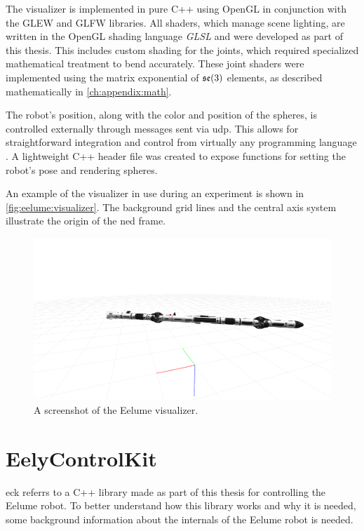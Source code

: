 The visualizer is implemented in pure C++ using OpenGL in conjunction with the 
GLEW and GLFW libraries. All shaders, which manage scene lighting, are written 
in the OpenGL shading language \textit{GLSL} and were developed as part of 
this thesis. This includes custom shading for the joints, which required 
specialized mathematical treatment to bend accurately. These joint shaders 
were implemented using the matrix exponential of \(\mathfrak{se}(3)\) elements, as 
described mathematically in \autoref{ch:appendix:math}.

The robot's position, along with the color and position of the spheres, is 
controlled externally through messages sent via \gls{udp}. This allows for 
straightforward integration and control from virtually any programming language
. A lightweight C++ header file was created to expose functions for setting 
the robot's pose and rendering spheres.

An example of the visualizer in use during an experiment is shown in
\autoref{fig:eelume:visualizer}. The background grid lines and the central
axis system illustrate the origin of the \gls{ned} frame.
\begin{figure}[h!]
    \centering
    \includegraphics[width=\textwidth]{assets/eely-visualizer.png}
    \caption{A screenshot of the Eelume visualizer.}
    \label{fig:eelume:visualizer}
\end{figure}

\FloatBarrier

\section{EelyControlKit}

\iffalse
\gls{eck} referrs to a C++ library made as part of this thesis for controlling the Eelume robot.
To better
understand how this library works and why it is needed, some background information
about the internals of the Eelume robot is needed.

